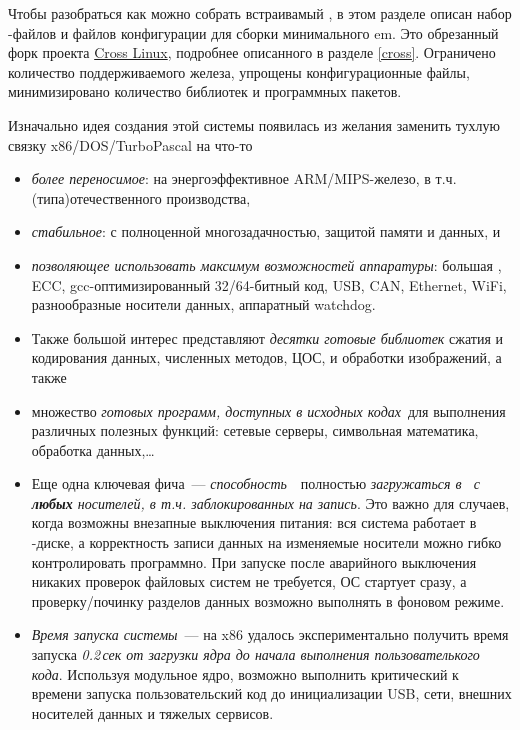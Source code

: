 \label{azlin}\secdown

Чтобы разобраться как можно собрать встраивамый \linux, в этом разделе описан
набор \make-файлов и файлов конфигурации для сборки минимального em\linux.
Это обрезанный форк проекта \href{https://github.com/user/cross}{Cross
Linux}, подробнее описанного в разделе \ref{cross}. Ограничено количество
поддерживаемого железа, упрощены конфигурационные файлы, минимизировано
количество библиотек и программных пакетов.

\bigskip

Изначально идея создания этой системы появилась из желания заменить тухлую
связку x86/DOS/Tur\-bo\-Pas\-cal на что-то

\begin{itemize}
  \item \emph{более переносимое}: на
 энергоэффективное ARM/MIPS-железо, в т.ч. (типа)отечественного производства,
\item \emph{стабильное}: с полноценной многозадачностью,
защитой памяти и данных, и
\item \emph{позволяющее использовать максимум возможностей аппаратуры}: большая
\ram, ECC, gcc-оп\-ти\-ми\-зи\-ро\-ван\-ный 32/64-битный код, USB, CAN, Ethernet,
WiFi, разнообразные носители данных, аппаратный watchdog.

\item Также большой интерес представляют \emph{десятки готовые библиотек} сжатия
и кодирования данных, численных методов, ЦОС, и обработки изображений, а также

\item множество \emph{готовых программ, доступных в исходных кодах}\ для выполнения различных полезных функций: сетевые серверы,
символьная математика, обработка данных,\ldots

\item Еще одна ключевая фича\ --- \emph{способность}\ \linux\ полностью
\emph{загружаться в \ram\ с \textbf{любых} носителей, в т.ч. заблокированных на
запись}. Это важно для случаев, когда возможны внезапные выключения питания:
вся система работает в \ram-диске, а корректность записи данных на изменяемые
носители можно гибко контролировать программно. При запуске после аварийного
выключения никаких проверок файловых систем не требуется, ОС стартует сразу, а
проверку/починку разделов данных возможно выполнять в фоновом режиме.

\item \emph{Время запуска системы}\ --- на x86 удалось экспериментально получить
время запуска \emph{0.2\,сек от загрузки ядра до начала выполнения
пользователького кода}.
Используя модульное ядро, возможно выполнить критический к времени запуска
пользовательский код до инициализации USB, сети, внешних носителей данных и
тяжелых сервисов.

\end{itemize}


